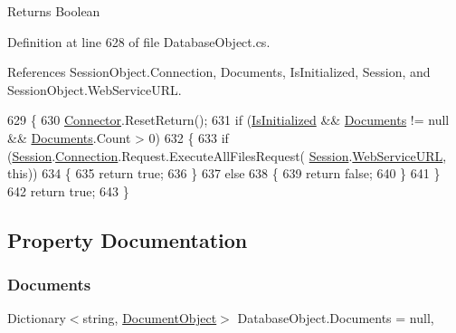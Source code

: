 \begin{DoxyReturn}{Returns}
Boolean
\end{DoxyReturn}


Definition at line 628 of file Database\+Object.\+cs.



References Session\+Object.\+Connection, Documents, Is\+Initialized, Session, and Session\+Object.\+Web\+Service\+U\+RL.


\begin{DoxyCode}
629     \{
630         \mbox{\hyperlink{class_connector}{Connector}}.ResetReturn();
631         \textcolor{keywordflow}{if} (\mbox{\hyperlink{class_database_object_a5fe036d32a30eb10d1b3f6a30263f740}{IsInitialized}} && \mbox{\hyperlink{class_database_object_afaf1159aa427c5bcce01c4b8c6f34514}{Documents}} != null && 
      \mbox{\hyperlink{class_database_object_afaf1159aa427c5bcce01c4b8c6f34514}{Documents}}.Count > 0)
632         \{
633             \textcolor{keywordflow}{if} (\mbox{\hyperlink{class_database_object_aa8484162b7d2a7c4c9426bca13c64c07}{Session}}.\mbox{\hyperlink{class_session_object_a014bdbf705a753540e19bfb53030c55c}{Connection}}.Request.ExecuteAllFilesRequest(
      \mbox{\hyperlink{class_database_object_aa8484162b7d2a7c4c9426bca13c64c07}{Session}}.\mbox{\hyperlink{class_session_object_a697c071c812fbf7ad1166b896fb44c16}{WebServiceURL}}, \textcolor{keyword}{this}))
634             \{
635                 \textcolor{keywordflow}{return} \textcolor{keyword}{true};
636             \}
637             \textcolor{keywordflow}{else}
638             \{
639                 \textcolor{keywordflow}{return} \textcolor{keyword}{false};
640             \}
641         \}
642         \textcolor{keywordflow}{return} \textcolor{keyword}{true};
643     \}
\end{DoxyCode}


\subsection{Property Documentation}
\mbox{\label{class_database_object_afaf1159aa427c5bcce01c4b8c6f34514}} 
\subsubsection{\texorpdfstring{Documents}{Documents}}
{\footnotesize\ttfamily Dictionary$<$string, \mbox{\hyperlink{class_document_object}{Document\+Object}}$>$ Database\+Object.\+Documents = null\hspace{0.3cm}{\ttfamily [get]}, {\ttfamily [set]}}



